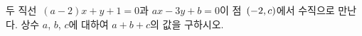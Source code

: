 두 직선~$(a-2)x+y+1=0$과 $ax-3y+b=0$이 점~$(-2{,}\mkern3mu\mathopen{}c)$에서 수직으로 만난다. 상수 $a$, $b$, $c$에 대하여 $a+b+c$의 값을 구하시오. 

